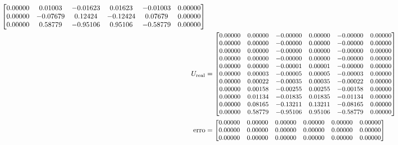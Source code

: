 \documentclass[a4paper, 11pt]{report}
\begin{document}
\begin{enumerate}[leftmargin=*]
\begin{minipage}{0.6\columnwidth}
\begin{align*}
{\begin{bmatrix}
                    0.00000 &   0.01003 &  -0.01623 &   0.01623 &  -0.01003 &   0.00000\\  
                    0.00000 &  -0.07679 &   0.12424 &  -0.12424 &   0.07679 &   0.00000\\  
                    0.00000 &   0.58779 &  -0.95106 &   0.95106 &  -0.58779 &   0.00000\\  
                \end{bmatrix}}\\
                U_{\text{real}} &=
                {\small
                \begin{bmatrix}
                    0.00000 &  0.00000 & -0.00000 &  0.00000 &  -0.00000  & 0.00000 \\  
                    0.00000 &  0.00000 & -0.00000 &  0.00000 &  -0.00000  & 0.00000 \\  
                    0.00000 &  0.00000 & -0.00000 &  0.00000 &  -0.00000  & 0.00000 \\  
                    0.00000 &  0.00000 & -0.00000 &  0.00000 &  -0.00000  & 0.00000 \\  
                    0.00000 &  0.00000 & -0.00001 &  0.00001 &  -0.00000  & 0.00000 \\  
                    0.00000 &  0.00003 & -0.00005 &  0.00005 &  -0.00003  & 0.00000 \\  
                    0.00000 &  0.00022 & -0.00035 &  0.00035 &  -0.00022  & 0.00000 \\  
                    0.00000 &  0.00158 & -0.00255 &  0.00255 &  -0.00158  & 0.00000 \\  
                    0.00000 &  0.01134 & -0.01835 &  0.01835 &  -0.01134  & 0.00000 \\  
                    0.00000 &  0.08165 & -0.13211 &  0.13211 &  -0.08165  & 0.00000 \\  
                    0.00000 &  0.58779 & -0.95106 &  0.95106 &  -0.58779  & 0.00000 \\ 
                \end{bmatrix}}\\
                \text{erro} &= 
                {\small
                \begin{bmatrix}
                    0.00000  & 0.00000  & 0.00000 &  0.00000  & 0.00000  & 0.00000  \\
                    0.00000  & 0.00000  & 0.00000 &  0.00000  & 0.00000  & 0.00000  \\
                    0.00000  & 0.00000  & 0.00000 &  0.00000  & 0.00000  & 0.00000  \\

\end{bmatrix}}
\end{align*}
\end{minipage}
\end{enumerate}
\end{document}

